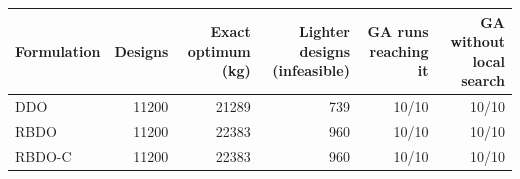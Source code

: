 \begin{tabular}{lrrrrr}
\toprule
Formulation & Designs & Exact optimum (kg) & Lighter designs (infeasible) & GA runs reaching it & GA without local search \\
\midrule
DDO & 11200 & 21289 & 739 & 10/10 & 10/10 \\
RBDO & 11200 & 22383 & 960 & 10/10 & 10/10 \\
RBDO-C & 11200 & 22383 & 960 & 10/10 & 10/10 \\
\bottomrule
\end{tabular}